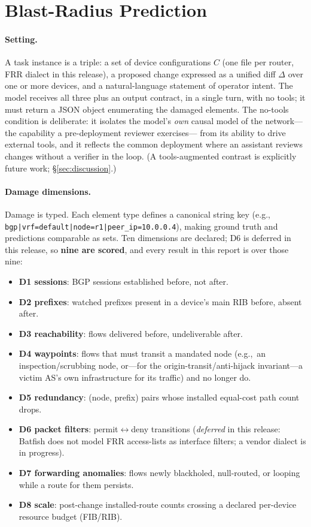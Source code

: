 \documentclass[11pt]{article}
\newcommand{\eg}{e.g.,\ }
\begin{document}
\section{Blast-Radius Prediction}
\label{sec:task}

\paragraph{Setting.} A task instance is a triple: a set of device
configurations $C$ (one file per router, FRR dialect in this release), a
proposed change expressed as a unified diff $\Delta$ over one or more
devices, and a natural-language statement of operator intent. The model
receives all three plus an output contract, in a single turn, with no tools;
it must return a JSON object enumerating the damaged elements. The
no-tools condition is deliberate: it isolates the model's \emph{own} causal
model of the network---the capability a pre-deployment reviewer exercises---
from its ability to drive external tools, and it reflects the common
deployment where an assistant reviews changes without a verifier in the
loop. (A tools-augmented contrast is explicitly future work; \S\ref{sec:discussion}.)

\paragraph{Damage dimensions.} Damage is typed. Each element type defines a
canonical string key (\eg
\texttt{bgp|vrf=default|node=r1|peer\_ip=10.0.0.4}), making ground truth and
predictions comparable as sets. Ten dimensions are declared; D6 is deferred
in this release, so \textbf{nine are scored}, and every result in this
report is over those nine:

\begin{itemize}\itemsep0.15em
  \item \textbf{D1 sessions}: BGP sessions established before, not after.
  \item \textbf{D2 prefixes}: watched prefixes present in a device's main
        RIB before, absent after.
  \item \textbf{D3 reachability}: flows delivered before, undeliverable after.
  \item \textbf{D4 waypoints}: flows that must transit a mandated node (\eg an
        inspection/scrubbing node, or---for the origin-transit/anti-hijack
        invariant---a victim AS's own infrastructure for its traffic) and no
        longer do.
  \item \textbf{D5 redundancy}: (node, prefix) pairs whose installed
        equal-cost path count drops.
  \item \textbf{D6 packet filters}: permit$\leftrightarrow$deny transitions
        (\emph{deferred} in this release: Batfish does not model FRR
        access-lists as interface filters; a vendor dialect is in progress).
  \item \textbf{D7 forwarding anomalies}: flows newly blackholed,
        null-routed, or looping while a route for them persists.
  \item \textbf{D8 scale}: post-change installed-route counts crossing a
        declared per-device resource budget (FIB/RIB).
\end{itemize}
\end{document}

